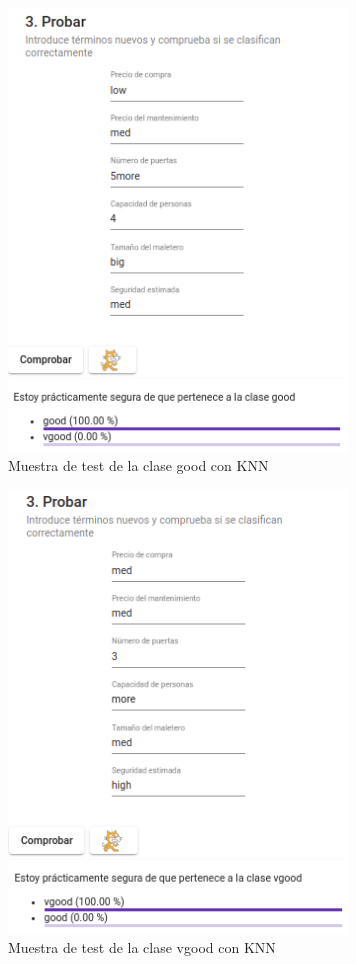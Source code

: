 \documentclass[a4paper, 12pt]{book}
\begin{document}
\begin{figure}
	\centering
	\includegraphics[width=9cm, keepaspectratio]{img/good_knn.png}
	\caption{Muestra de test de la clase good con KNN} 	\label{fig:ejemplo24}
\end{figure}

\begin{figure}
	\centering
	\includegraphics[width=9cm, keepaspectratio]{img/vgood_knn.png}
	\caption{Muestra de test de la clase vgood con KNN} 	\label{fig:ejemplo25}
\end{figure}
\end{document}
